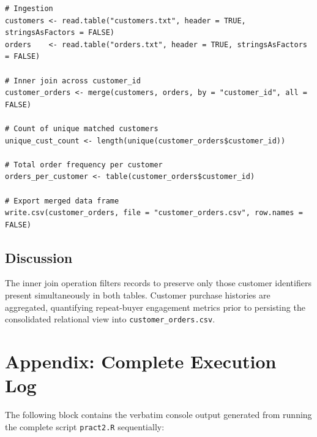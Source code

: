 \documentclass[11pt,a4paper]{article}
\begin{document}
\begin{lstlisting}
# Ingestion
customers <- read.table("customers.txt", header = TRUE, stringsAsFactors = FALSE)
orders    <- read.table("orders.txt", header = TRUE, stringsAsFactors = FALSE)

# Inner join across customer_id
customer_orders <- merge(customers, orders, by = "customer_id", all = FALSE)

# Count of unique matched customers
unique_cust_count <- length(unique(customer_orders$customer_id))

# Total order frequency per customer
orders_per_customer <- table(customer_orders$customer_id)

# Export merged data frame
write.csv(customer_orders, file = "customer_orders.csv", row.names = FALSE)
\end{lstlisting}

\subsection{Discussion}
The inner join operation filters records to preserve only those customer identifiers present simultaneously in both tables. Customer purchase histories are aggregated, quantifying repeat-buyer engagement metrics prior to persisting the consolidated relational view into \texttt{customer\_orders.csv}.

\newpage
\appendix
\section*{Appendix: Complete Execution Log}

The following block contains the verbatim console output generated from running the complete script \texttt{pract2.R} sequentially:


\end{document}
